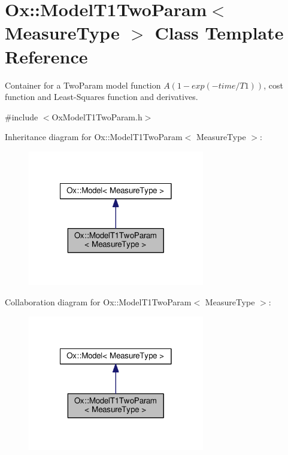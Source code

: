 \hypertarget{class_ox_1_1_model_t1_two_param}{\section{Ox\-:\-:Model\-T1\-Two\-Param$<$ Measure\-Type $>$ Class Template Reference}
\label{class_ox_1_1_model_t1_two_param}
}


Container for a Two\-Param model function $ A(1 - exp( -time / T1 )) $, cost function and Least-\/\-Squares function and derivatives.  




{\ttfamily \#include $<$Ox\-Model\-T1\-Two\-Param.\-h$>$}



Inheritance diagram for Ox\-:\-:Model\-T1\-Two\-Param$<$ Measure\-Type $>$\-:
\nopagebreak
\begin{figure}[H]
\begin{center}
\leavevmode
\includegraphics[width=218pt]{class_ox_1_1_model_t1_two_param__inherit__graph}
\end{center}
\end{figure}


Collaboration diagram for Ox\-:\-:Model\-T1\-Two\-Param$<$ Measure\-Type $>$\-:
\nopagebreak
\begin{figure}[H]
\begin{center}
\leavevmode
\includegraphics[width=218pt]{class_ox_1_1_model_t1_two_param__coll__graph}
\end{center}
\end{figure}
